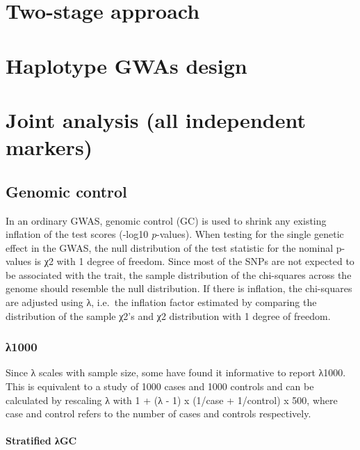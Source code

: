 \documentclass[
]{book}
\begin{document}
\hypertarget{two-stage-approach}{%
\section{Two-stage approach}\label{two-stage-approach}}

\hypertarget{haplotype-gwas-design}{%
\section{Haplotype GWAs design}\label{haplotype-gwas-design}}

\hypertarget{joint-analysis-all-independent-markers}{%
\section{Joint analysis (all independent markers)}\label{joint-analysis-all-independent-markers}}

\hypertarget{genomic-control}{%
\subsection{Genomic control}\label{genomic-control}}

In an ordinary GWAS, genomic control (GC) is used to shrink any existing inflation of the test scores (-log10 \emph{p}-values). When testing for the single genetic effect in the GWAS, the null distribution of the test statistic for the nominal p-values is χ2 with 1 degree of freedom. Since most of the SNPs are not expected to be associated with the trait, the sample distribution of the chi-squares across the genome should resemble the null distribution. If there is inflation, the chi-squares are adjusted using λ, i.e.~the inflation factor estimated by comparing the distribution of the sample χ2's and χ2 distribution with 1 degree of freedom.

\hypertarget{ux3bb1000}{%
\subsubsection{λ1000}\label{ux3bb1000}}

Since λ scales with sample size, some have found it informative to report λ1000. This is equivalent to a study of 1000 cases and 1000 controls and can be calculated by rescaling λ with 1 + (λ - 1) x (1/case + 1/control) x 500, where case and control refers to the number of cases and controls respectively.

\hypertarget{stratified-ux3bbgc}{%
\paragraph{Stratified λGC}\label{stratified-ux3bbgc}}
\end{document}
